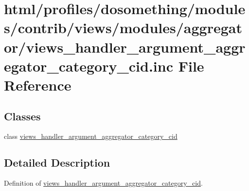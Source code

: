 \hypertarget{views__handler__argument__aggregator__category__cid_8inc}{
\section{html/profiles/dosomething/modules/contrib/views/modules/aggregator/views\_\-handler\_\-argument\_\-aggregator\_\-category\_\-cid.inc File Reference}
\label{views__handler__argument__aggregator__category__cid_8inc}
}
\subsection*{Classes}
\begin{DoxyCompactItemize}
\item 
class \hyperlink{classviews__handler__argument__aggregator__category__cid}{views\_\-handler\_\-argument\_\-aggregator\_\-category\_\-cid}
\end{DoxyCompactItemize}


\subsection{Detailed Description}
Definition of \hyperlink{classviews__handler__argument__aggregator__category__cid}{views\_\-handler\_\-argument\_\-aggregator\_\-category\_\-cid}. 